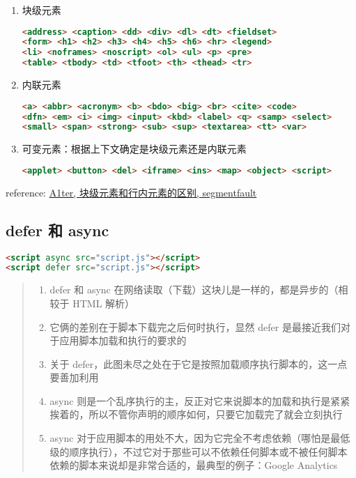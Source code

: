 \begin{enumerate}
\def\labelenumi{\arabic{enumi}.}
\item
  块级元素

\begin{lstlisting}[language=HTML]
<address> <caption> <dd> <div> <dl> <dt> <fieldset>
<form> <h1> <h2> <h3> <h4> <h5> <h6> <hr> <legend>
<li> <noframes> <noscript> <ol> <ul> <p> <pre>
<table> <tbody> <td> <tfoot> <th> <thead> <tr>
\end{lstlisting}
\item
  内联元素

\begin{lstlisting}[language=HTML]
<a> <abbr> <acronym> <b> <bdo> <big> <br> <cite> <code>
<dfn> <em> <i> <img> <input> <kbd> <label> <q> <samp> <select>
<small> <span> <strong> <sub> <sup> <textarea> <tt> <var>
\end{lstlisting}
\item
  可变元素：根据上下文确定是块级元素还是内联元素

\begin{lstlisting}[language=HTML]
<applet> <button> <del> <iframe> <ins> <map> <object> <script>
\end{lstlisting}
\end{enumerate}

reference: \href{http://segmentfault.com/a/1190000003714074}{A1ter,
块级元素和行内元素的区别, segmentfault}

\subsection{defer 和 async}\label{defer-ux548c-async}

\begin{lstlisting}[language=HTML]
<script async src="script.js"></script>
<script defer src="script.js"></script>
\end{lstlisting}

\begin{quote}
\begin{enumerate}
\def\labelenumi{\arabic{enumi}.}
\tightlist
\item
  defer 和 async 在网络读取（下载）这块儿是一样的，都是异步的（相较于
  HTML 解析）
\item
  它俩的差别在于脚本下载完之后何时执行，显然 defer
  是最接近我们对于应用脚本加载和执行的要求的
\item
  关于
  defer，此图未尽之处在于它是按照加载顺序执行脚本的，这一点要善加利用
\item
  async
  则是一个乱序执行的主，反正对它来说脚本的加载和执行是紧紧挨着的，所以不管你声明的顺序如何，只要它加载完了就会立刻执行
\item
  async
  对于应用脚本的用处不大，因为它完全不考虑依赖（哪怕是最低级的顺序执行），不过它对于那些可以不依赖任何脚本或不被任何脚本依赖的脚本来说却是非常合适的，最典型的例子：Google
  Analytics
\end{enumerate}
\end{quote}

